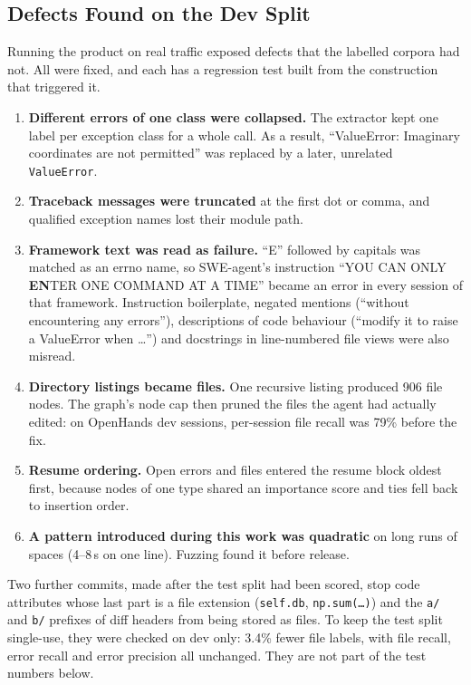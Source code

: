 \documentclass[journal]{IEEEtran}
\begin{document}
\subsection{Defects Found on the Dev Split}
\label{sec:real-defects}

Running the product on real traffic exposed defects that the
labelled corpora had not. All were fixed, and each has a
regression test built from the construction that triggered it.
\begin{enumerate}
\item \textbf{Different errors of one class were collapsed.} The
  extractor kept one label per exception class for a whole call.
  As a result, ``ValueError: Imaginary coordinates are not
  permitted'' was replaced by a later, unrelated
  \texttt{ValueError}.
\item \textbf{Traceback messages were truncated} at the first dot
  or comma, and qualified exception names lost their module path.
\item \textbf{Framework text was read as failure.} ``E'' followed
  by capitals was matched as an errno name, so SWE-agent's
  instruction ``YOU CAN ONLY \textbf{EN}TER ONE COMMAND AT A
  TIME'' became an error in every session of that framework.
  Instruction boilerplate, negated mentions (``without
  encountering any errors''), descriptions of code behaviour
  (``modify it to raise a ValueError when \ldots'') and
  docstrings in line-numbered file views were also misread.
\item \textbf{Directory listings became files.} One recursive
  listing produced 906 file nodes. The graph's node cap then
  pruned the files the agent had actually edited: on OpenHands
  dev sessions, per-session file recall was 79\% before the fix.
\item \textbf{Resume ordering.} Open errors and files entered the
  resume block oldest first, because nodes of one type shared an
  importance score and ties fell back to insertion order.
\item \textbf{A pattern introduced during this work was quadratic}
  on long runs of spaces (4--8\,s on one line). Fuzzing found it
  before release.
\end{enumerate}
Two further commits, made after the test split had been scored, stop
code attributes whose last part is a file extension
(\texttt{self.db}, \texttt{np.sum(\ldots)}) and the \texttt{a/} and
\texttt{b/} prefixes of diff headers from being stored as files.
To keep the test split single-use, they were checked on dev only: 3.4\%
fewer file labels, with file recall, error recall and error precision
all unchanged. They are not part of the test numbers below.
\end{document}
